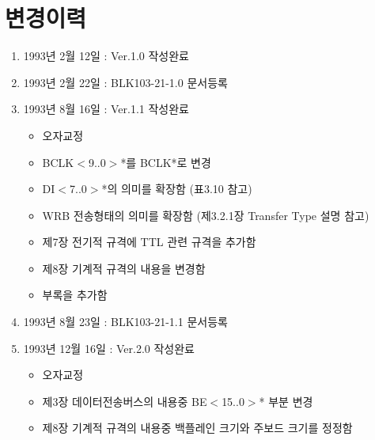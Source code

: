 \documentclass[12pt]{book}
\begin{document}
\def\HB{HiPi+Bus}	%
%
\tableofcontents
{}
\newpage
\listoffigures
{}
\newpage
\listoftables
{}
%
\newpage
\chapter*{변경이력}
%
\begin{enumerate}
  \item 1993년 2월 12일 : Ver.1.0 작성완료
  \item 1993년 2월 22일 : BLK103-21-1.0 문서등록
  \item 1993년 8월 16일 : Ver.1.1 작성완료
	\begin{itemize}
	  \item 오자교정
	  \item BCLK$<$9..0$>$*를 BCLK*로 변경
	  \item DI$<$7..0$>$*의 의미를 확장함 (표3.10 참고)
	  \item WRB 전송형태의 의미를 확장함 (제3.2.1장 Transfer Type 설명 참고)
	  \item 제7장 전기적 규격에 TTL 관련 규격을 추가함
	  \item 제8장 기계적 규격의 내용을 변경함
	  \item 부록을 추가함
	\end{itemize}
  \item 1993년 8월 23일 : BLK103-21-1.1 문서등록
  \item 1993년 12월 16일 : Ver.2.0 작성완료
	\begin{itemize}
	  \item 오자교정
	  \item 제3장 데이터전송버스의 내용중 BE$<$15..0$>$* 부분 변경
	  \item 제8장 기계적 규격의 내용중 백플레인 크기와 주보드 크기를 정정함
	\end{itemize}
\end{enumerate}
\end{document}
